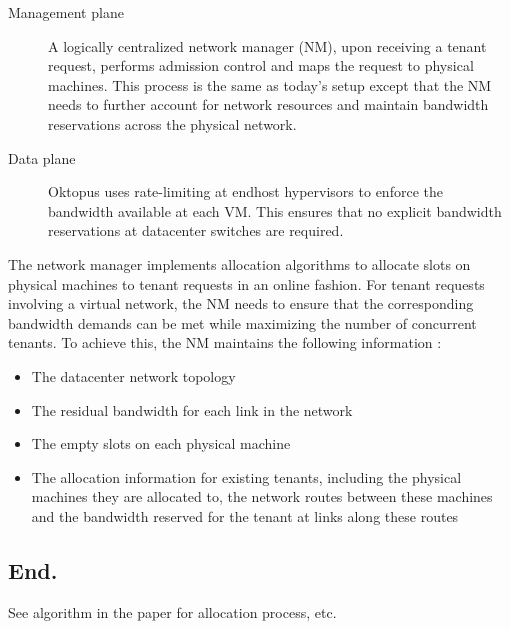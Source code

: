 \begin{description}
 \item[Management plane] A logically centralized network manager
(NM), upon receiving a tenant request, performs
admission control and maps the request to physical machines.
This process is the same as today’s setup except
that the NM needs to further account for network resources
and maintain bandwidth reservations across the
physical network.
\item[Data plane] Oktopus uses rate-limiting at endhost hypervisors
to enforce the bandwidth available at each VM.
This ensures that no explicit bandwidth reservations at
datacenter switches are required.
 \end{description}

 The network manager implements allocation algorithms
to allocate slots on physical machines to tenant requests in
an online fashion. For tenant requests involving a virtual
network, the NM needs to ensure that the corresponding
bandwidth demands can be met while maximizing the number
of concurrent tenants. To achieve this, the NM maintains
the following information :
\begin{itemize}
\item The datacenter network
topology
\item The residual bandwidth for each link in the
network
\item The empty slots on each physical machine
\item The allocation information for existing tenants,
including the physical machines they are allocated to, the
network routes between these machines and the bandwidth
reserved for the tenant at links along these routes
\end{itemize}

\subsection{End.}

See algorithm in the paper for allocation process, etc.




